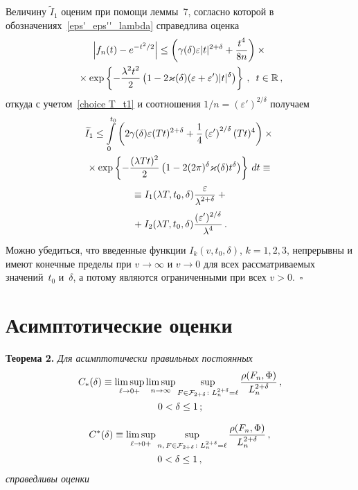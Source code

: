 \begin{multicols}{2}
Величину $\widetilde I_1$ оценим при помощи
леммы~7, согласно которой в
обозначениях~\eqref{eps'_eps''_lambda} справедлива оценка
\begin{multline*}
\left|f_n(t)- e^{-t^2/2}\right|
\le \left(\gamma(\delta)\varepsilon |t|^{2+\delta}+
\displaystyle\frac{\displaystyle t^4\mathstrut}{\displaystyle 8n\mathstrut}\right)\times{}\\
{}\times
 \exp\left\{-\displaystyle\frac{\displaystyle \lambda^2t^2\mathstrut}{\displaystyle 2\mathstrut} \left(1-
2\varkappa(\delta)(\varepsilon+\varepsilon')|t|^{\delta} \right)\right\}\,,\enskip
t\in\mathbb R\,,
\end{multline*}
откуда с учетом~\eqref{choice T_t1} и соотношения
$1/n=(\varepsilon')^{2/\delta}$ получаем
\begin{multline*}
\widetilde I_1\le \int\limits_0^{t_0}\left(2\gamma(\delta)\varepsilon(Tt)^{2+\delta}+
\displaystyle\frac{\displaystyle 1\mathstrut}{\displaystyle 4\mathstrut}\left(\varepsilon'\right)^{2/\delta}(Tt)^4\right)\times{}\\
{}\times  \exp\left\{-\displaystyle\frac{\displaystyle (\lambda
Tt)^2\mathstrut}{\displaystyle 2\mathstrut} \left(1-2(2\pi)^\delta\varkappa(\delta)t^{\delta} \right)\right\}\,dt
\equiv{}\\
{}\equiv I_1(\lambda T,t_0,\delta)\displaystyle\frac{\displaystyle \varepsilon\mathstrut}{\displaystyle \lambda^{2+\delta}\mathstrut}+{}\\
{}+I_{2}(\lambda T,t_0,\delta)\displaystyle\frac{\displaystyle (\varepsilon')^{2/\delta}\mathstrut}{\displaystyle \lambda^4\mathstrut}\,.
\end{multline*}
Можно убедиться, что введенные функции $I_k(v,t_0,\delta)$, $k=1,2,3$,
непрерывны и имеют конечные пределы при $v\to\infty$ и $v\to 0$ для
всех рассматриваемых значений~$t_0$ и~$\delta$, а потому являются
ограниченными при всех $v>0$.~$\square$

\section{Асимптотические оценки} \label{asympt_estims}

\noindent
\textbf{Теорема 2.}
\textit{Для асимптотически правильных постоянных}
\begin{multline*}
C_*(\delta)\equiv \limsup_{\ell\to0+}\limsup_{n\to\infty}
\sup_{F\in{\mathcal F}_{2+\delta}\colon L_n^{2+\delta}=\ell}
\displaystyle\frac{\displaystyle \rho(F_n,\Phi)\mathstrut}{\displaystyle L_n^{2+\delta}\mathstrut}\,,\\
 0<\delta \le 1\,;
\end{multline*}

\vspace*{-12pt}

\noindent
\begin{multline*}
C^*(\delta)\equiv \limsup_{\ell\to0+}\sup_{n,\,F\in{\mathcal F}_{2+\delta}\colon
L_n^{2+\delta}=\ell}\displaystyle\frac{\displaystyle  \rho(F_n,\Phi)\mathstrut}{\displaystyle L_n^{2+\delta}\mathstrut}\,,\\
 0<\delta\le1\,,
\end{multline*}
\textit{справедливы оценки}


\end{multicols}
